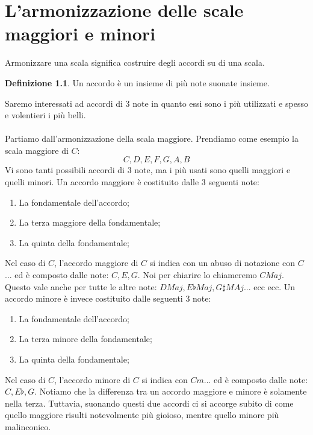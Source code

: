\documentclass[12pt,a4paper]{book}
\theoremstyle{definition}
\newtheorem{Def}{Definizione}[chapter]
\theoremstyle{Theorem}
\theoremstyle{definition}
\theoremstyle{definition}
\theoremstyle{definition}
\begin{document}
	 		\chapter[l'armonizzazione]{L'armonizzazione delle scale maggiori e minori}
	 		Armonizzare una scala significa costruire degli accordi su di una scala.
	 		\begin{Def}
	 			Un accordo è un insieme di più note suonate insieme.
	 		\end{Def}
	 		Saremo interessati ad accordi di $3$ note in quanto essi sono i più utilizzati e spesso e volentieri i più belli.\\
	 		\\
	 		Partiamo dall'armonizzazione della scala maggiore.
	 		Prendiamo come esempio la scala maggiore di $C$:
	 		$$C,D,E,F,G,A,B$$
	 		Vi sono tanti possibili accordi di 3 note, ma i più usati sono quelli maggiori e quelli minori. Un accordo maggiore è costituito dalle 3 seguenti note: 
	 		\begin{enumerate}
	 			\item La fondamentale dell'accordo;\\
	 			\item La terza maggiore della fondamentale;\\
	 			\item La quinta della fondamentale;\\
	 		\end{enumerate}
	 		Nel caso di $C$, l'accordo maggiore di $C$ si indica con un abuso di notazione con $C$... ed è composto dalle note: $C,E,G$. Noi per chiarire lo chiameremo $CMaj$. Questo vale anche per tutte le altre note: $DMaj, E\flat Maj,G\sharp MAj...$ ecc ecc.
	 		Un accordo minore è invece costituito dalle seguenti 3 note:
	 		\begin{enumerate}
	 			\item La fondamentale dell'accordo;\\
	 			\item La terza minore della fondamentale;\\
	 			\item La quinta della fondamentale;\\
	 		\end{enumerate}
	 		Nel caso di $C$, l'accordo minore di $C$ si indica con $Cm$... ed è composto dalle note: $C,E\flat,G$.
	 		Notiamo che la differenza tra un accordo maggiore e minore è solamente nella terza. Tuttavia, suonando questi due accordi ci si accorge subito di come quello maggiore risulti notevolmente più gioioso, mentre quello minore più malinconico.
\end{document}
